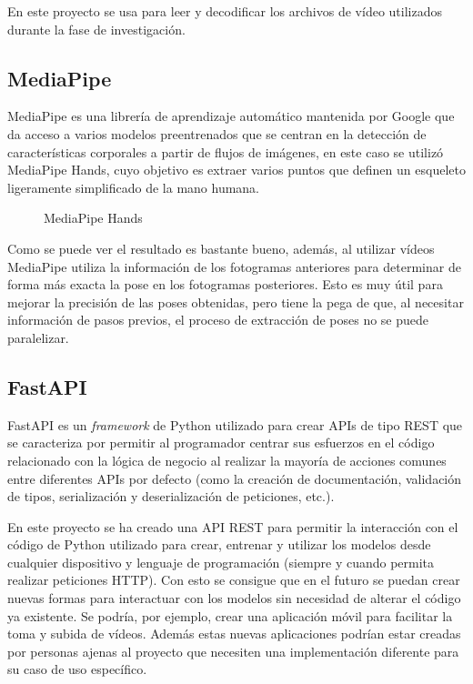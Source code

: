 En este proyecto se usa para leer y decodificar los archivos de vídeo utilizados
durante la fase de investigación.

\subsection{MediaPipe}

MediaPipe es una librería de aprendizaje automático mantenida por Google que da
acceso a varios modelos preentrenados que se centran en la detección de
características corporales a partir de flujos de imágenes, en este caso se
utilizó MediaPipe Hands\cite{zhang2020mediapipe}, cuyo objetivo es extraer
varios puntos que definen un esqueleto ligeramente simplificado de la mano
humana.

\begin{figure}[H]
      \centering
      \caption{MediaPipe Hands}
\end{figure}

Como se puede ver el resultado es bastante bueno, además, al utilizar vídeos
MediaPipe utiliza la información de los fotogramas anteriores para determinar de
forma más exacta la pose en los fotogramas posteriores. Esto es muy útil para
mejorar la precisión de las poses obtenidas, pero tiene la pega de que, al
necesitar información de pasos previos, el proceso de extracción de poses no se
puede paralelizar.

\subsection{FastAPI}

FastAPI es un \textit{framework} de Python utilizado para crear APIs de tipo
REST que se caracteriza por permitir al programador centrar sus esfuerzos en el
código relacionado con la lógica de negocio al realizar la mayoría de acciones
comunes entre diferentes APIs por defecto (como la creación de documentación,
validación de tipos, serialización y deserialización de peticiones, etc.).

En este proyecto se ha creado una API REST para permitir la interacción con el
código de Python utilizado para crear, entrenar y utilizar los modelos desde
cualquier dispositivo y lenguaje de programación (siempre y cuando permita
realizar peticiones HTTP). Con esto se consigue que en el futuro se puedan crear
nuevas formas para interactuar con los modelos sin necesidad de alterar el
código ya existente. Se podría, por ejemplo, crear una aplicación móvil para
facilitar la toma y subida de vídeos. Además estas nuevas aplicaciones podrían
estar creadas por personas ajenas al proyecto que necesiten una implementación
diferente para su caso de uso específico.

